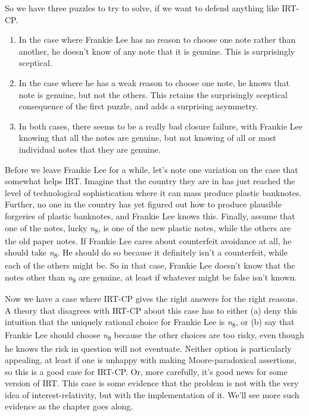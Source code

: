 \documentclass[
  10pt,
  letterpaper,
  twoside]{scrbook}
\providecommand{\tightlist}{%
  \setlength{\itemsep}{0pt}\setlength{\parskip}{0pt}}\usepackage{longtable,booktabs,array}
\begin{document}
So we have three puzzles to try to solve, if we want to defend anything
like IRT-CP.

\begin{enumerate}
\def\labelenumi{\arabic{enumi}.}
\tightlist
\item
  In the case where Frankie Lee has no reason to choose one note rather
  than another, he doesn't know of any note that it is genuine. This is
  surprisingly sceptical.
\item
  In the case where he has a weak reason to choose one note, he knows
  that note is genuine, but not the others. This retains the
  surprisingly sceptical consequence of the first puzzle, and adds a
  surprising asymmetry.
\item
  In both cases, there seems to be a really bad closure failure, with
  Frankie Lee knowing that all the notes are genuine, but not knowing of
  all or most individual notes that they are genuine.
\end{enumerate}

Before we leave Frankie Lee for a while, let's note one variation on the
case that somewhat helps IRT. Imagine that the country they are in has
just reached the level of technological sophistication where it can mass
produce plastic banknotes. Further, no one in the country has yet
figured out how to produce plausible forgeries of plastic banknotes, and
Frankie Lee knows this. Finally, assume that one of the notes, lucky
\emph{n}\textsubscript{8}, is one of the new plastic notes, while the
others are the old paper notes. If Frankie Lee cares about counterfeit
avoidance at all, he should take \emph{n}\textsubscript{8}. He should do
so because it definitely isn't a counterfeit, while each of the others
might be. So in that case, Frankie Lee doesn't know that the notes other
than \emph{n}\textsubscript{8} are genuine, at least if whatever might
be false isn't known.

Now we have a case where IRT-CP gives the right answers for the right
reasons. A theory that disagrees with IRT-CP about this case has to
either (a) deny this intuition that the uniquely rational choice for
Frankie Lee is \emph{n}\textsubscript{8}, or (b) say that Frankie Lee
should choose \emph{n}\textsubscript{8} because the other choices are
too risky, even though he knows the risk in question will not eventuate.
Neither option is particularly appealing, at least if one is unhappy
with making Moore-paradoxical assertions, so this is a good case for
IRT-CP. Or, more carefully, it's good news for some version of IRT. This
case is some evidence that the problem is not with the very idea of
interest-relativity, but with the implementation of it. We'll see more
such evidence as the chapter goes along.
\end{document}
